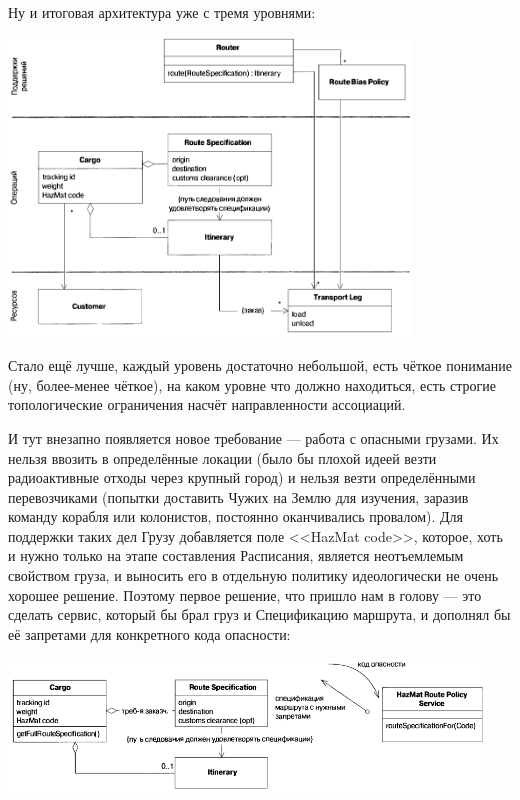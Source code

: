 \documentclass[a5paper]{article}
\begin{document}
Ну и итоговая архитектура уже с тремя уровнями:

\begin{center}
    \includegraphics[width=0.8\textwidth]{cargoThreeLayers.png}
\end{center}

Стало ещё лучше, каждый уровень достаточно небольшой, есть чёткое понимание (ну, более-менее чёткое), на каком уровне что должно находиться, есть строгие топологические ограничения насчёт направленности ассоциаций.

И тут внезапно появляется новое требование --- работа с опасными грузами. Их нельзя ввозить в определённые локации (было бы плохой идеей везти радиоактивные отходы через крупный город) и нельзя везти определёнными перевозчиками (попытки доставить Чужих на Землю для изучения, заразив команду корабля или колонистов, постоянно оканчивались провалом). Для поддержки таких дел Грузу добавляется поле <<HazMat code>>, которое, хоть и нужно только на этапе составления Расписания, является неотъемлемым свойством груза, и выносить его в отдельную политику идеологически не очень хорошее решение. Поэтому первое решение, что пришло нам в голову --- это сделать сервис, который бы брал груз и Спецификацию маршрута, и дополнял бы её запретами для конкретного кода опасности:

\begin{center}
    \includegraphics[width=0.95\textwidth]{cargoHazMatWrong.png}
\end{center}
\end{document}
